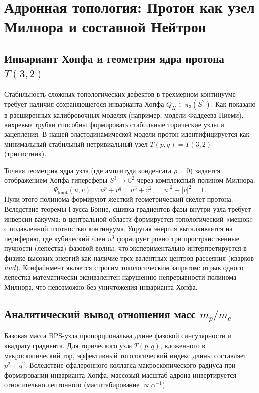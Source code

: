 \documentclass[11pt,a4paper]{article}
\begin{document}
\section{Адронная топология: Протон как узел Милнора и составной Нейтрон}

\subsection{Инвариант Хопфа и геометрия ядра протона $T(3,2)$}
Стабильность сложных топологических дефектов в трехмерном континууме требует наличия сохраняющегося инварианта Хопфа $Q_H \in \pi_3(S^2)$. Как показано в расширенных калибровочных моделях (например, модели Фаддеева-Ниеми), вихревые трубки способны формировать стабильные торические узлы и зацепления.
В нашей эластодинамической модели протон идентифицируется как минимальный стабильный нетривиальный узел $T(p,q) = T(3,2)$ (трилистник). 

Точная геометрия ядра узла (где амплитуда конденсата $\rho = 0$) задается отображением Хопфа гиперсферы $S^3 \to \mathbb{C}^2$ через комплексный полином Милнора:
\begin{equation}
\Psi_{\text{knot}}(u, v) = u^p + v^q = u^3 + v^2, \quad |u|^2 + |v|^2 = 1.
\end{equation}
Нули этого полинома формируют жесткий геометрический скелет протона. Вследствие теоремы Гаусса-Бонне, сшивка градиентов фазы внутри узла требует инверсии вакуума: в центральной области формируется топологический «мешок» с подавленной плотностью континуума. Упругая энергия выталкивается на периферию, где кубический член $u^3$ формирует ровно три пространственные пучности (лепестка) фазовой волны, что экспериментально интерпретируется в физике высоких энергий как наличие трех валентных центров рассеяния (кварков $uud$). Конфайнмент является строгим топологическим запретом: отрыв одного лепестка математически эквивалентен нарушению непрерывности полинома Милнора, что невозможно без уничтожения инварианта Хопфа.

\subsection{Аналитический вывод отношения масс $m_p/m_e$}
Базовая масса BPS-узла пропорциональна длине фазовой сингулярности и квадрату градиента. Для торического узла $T(p,q)$, вложенного в макроскопический тор, эффективный топологический индекс длины составляет $p^2 + q^2$. Вследствие сфалеронного коллапса макроскопического радиуса при формировании инварианта Хопфа, массовый масштаб адрона инвертируется относительно лептонного (масштабирование $\propto \alpha^{-1}$).
\end{document}
